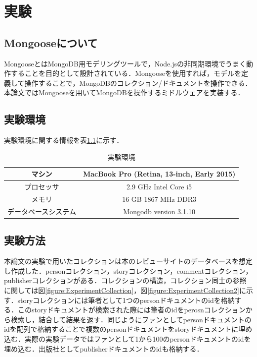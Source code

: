 \documentclass[a4paper,11pt]{ujreport}
\begin{document}
\chapter{実験}
\label{chap:Experiment}
\section{Mongooseについて}
MongooseとはMongoDB用モデリングツールで，Node.jsの非同期環境でうまく動作することを目的として設計されている．Mongooseを使用すれば，モデルを定義して操作することで，MongoDBのコレクション/ドキュメントを操作できる\cite{mongoose}．本論文ではMongooseを用いてMongoDBを操作するミドルウェアを実装する．

\section{実験環境}
実験環境に関する情報を表\ref{table:experiment_env}に示す．
\begin{table}[htb]
  \begin{center}
    \caption{実験環境}
		\label{table:experiment_env}
    \begin{tabular}{|c|c|} \hline
      マシン & MacBook Pro (Retina, 13-inch, Early 2015) \\ \hline
      プロセッサ & 2.9 GHz Intel Core i5\\ \hline
      メモリ & 16 GB 1867 MHz DDR3\\ \hline
      データベースシステム & Mongodb version 3.1.10\\ \hline
    \end{tabular}
  \end{center}
\end{table}

\section{実験方法}
本論文の実験で用いたコレクションは本のレビューサイトのデータベースを想定し作成した．personコレクション，storyコレクション，commentコレクション，publisherコレクションがある．コレクションの構造，コレクション同士の参照に関しては図\ref{figure:ExperimentCollection}，図\ref{figure:ExperimentCollection2}に示す．storyコレクションには筆者として1つのpersonドキュメントのidを格納する．このstoryドキュメントが検索された際には筆者のidをperosnコレクションから検索し，結合して結果を返す．同じようにファンとしてpersonドキュメントのidを配列で格納することで複数のpersonドキュメントをstoryドキュメントに埋め込む．実際の実験データではファンとして1から100のpersonドキュメントのidを埋め込む．出版社としてpublisherドキュメントのidも格納する．
\end{document}
